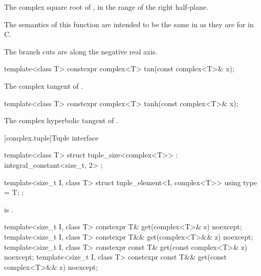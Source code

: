 \begin{itemdescr}
\pnum
\returns
The complex square root of , in the range of the right
half-plane.
\begin{note}
The semantics of this function are intended to be the same in \Cpp{}
as they are for  in C.
\end{note}

\pnum
\remarks
The branch cuts are along the negative real axis.
\end{itemdescr}

%
\begin{itemdecl}
template<class T> constexpr complex<T> tan(const complex<T>& x);
\end{itemdecl}

\begin{itemdescr}
\pnum
\returns
The complex tangent of .
\end{itemdescr}

%
\begin{itemdecl}
template<class T> constexpr complex<T> tanh(const complex<T>& x);
\end{itemdecl}

\begin{itemdescr}
\pnum
\returns
The complex hyperbolic tangent of .
\end{itemdescr}

[complex.tuple]{Tuple interface}

%
%
\begin{itemdecl}
template<class T>
struct tuple_size<complex<T>> : integral_constant<size_t, 2> {};

template<size_t I, class T>
struct tuple_element<I, complex<T>> {
  using type = T;
};
\end{itemdecl}

\begin{itemdescr}
\pnum
\mandates
{} is .
\end{itemdescr}

%
\begin{itemdecl}
template<size_t I, class T>
  constexpr T& get(complex<T>& z) noexcept;
template<size_t I, class T>
  constexpr T&& get(complex<T>&& z) noexcept;
template<size_t I, class T>
  constexpr const T& get(const complex<T>& z) noexcept;
template<size_t I, class T>
  constexpr const T&& get(const complex<T>&& z) noexcept;
\end{itemdecl}

